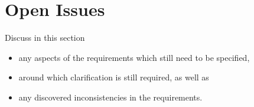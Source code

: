 \documentclass[a4paper,12pt]{article}
\begin{document}
\section{Open Issues}

Discuss in this section
\begin{itemize}
\item any aspects of the requirements which still need to be specified,
\item around which clarification is still required, as well as
\item any discovered inconsistencies in the requirements.
\end{itemize}
\end{document}
